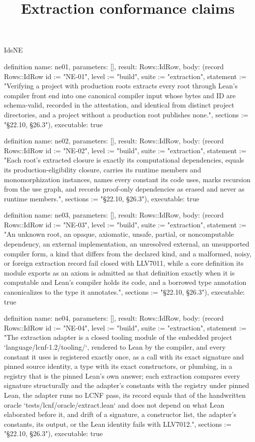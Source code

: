 \begin{lexlean}{IdsNE}
\title{Extraction conformance claims}
\begin{semanticmodule}
definition{
  name: ne01,
  parameters: [],
  result: Rows::IdRow,
  body: (record Rows::IdRow {id := "NE-01", level := "build", suite := "extraction", statement := "Verifying a project with production roots extracts every root through Lean's compiler front end into one canonical compiler input whose bytes and ID are schema-valid, recorded in the attestation, and identical from distinct project directories, and a project without a production root publishes none.", sections := "§22.10, §26.3"}),
  executable: true
}

definition{
  name: ne02,
  parameters: [],
  result: Rows::IdRow,
  body: (record Rows::IdRow {id := "NE-02", level := "build", suite := "extraction", statement := "Each root's extracted closure is exactly its computational dependencies, equals its production-eligibility closure, carries its runtime members and monomorphization instances, names every constant its code uses, marks recursion from the use graph, and records proof-only dependencies as erased and never as runtime members.", sections := "§22.10, §26.3"}),
  executable: true
}

definition{
  name: ne03,
  parameters: [],
  result: Rows::IdRow,
  body: (record Rows::IdRow {id := "NE-03", level := "build", suite := "extraction", statement := "An unknown root, an opaque, axiomatic, unsafe, partial, or noncomputable dependency, an external implementation, an unresolved external, an unsupported compiler form, a kind that differs from the declared kind, and a malformed, noisy, or foreign extraction record fail closed with LLV7011, while a core definition its module exports as an axiom is admitted as that definition exactly when it is computable and Lean's compiler holds its code, and a borrowed type annotation canonicalizes to the type it annotates.", sections := "§22.10, §26.3"}),
  executable: true
}

definition{
  name: ne04,
  parameters: [],
  result: Rows::IdRow,
  body: (record Rows::IdRow {id := "NE-04", level := "build", suite := "extraction", statement := "The extraction adapter is a closed tooling module of the embedded project `language/lcnf-1.2/tooling/`, rendered to Lean by the compiler, and every constant it uses is registered exactly once, as a call with its exact signature and pinned source identity, a type with its exact constructors, or plumbing, in a registry that is the pinned Lean's own answer; each extraction compares every signature structurally and the adapter's constants with the registry under pinned Lean, the adapter runs no LCNF pass, its record equals that of the handwritten oracle `tests/lcnf/oracle/extract.lean` and does not depend on what Lean elaborated before it, and drift of a signature, a constructor list, the adapter's constants, its output, or the Lean identity fails with LLV7012.", sections := "§22.10, §26.3"}),
  executable: true
}


\end{semanticmodule}
\end{lexlean}
